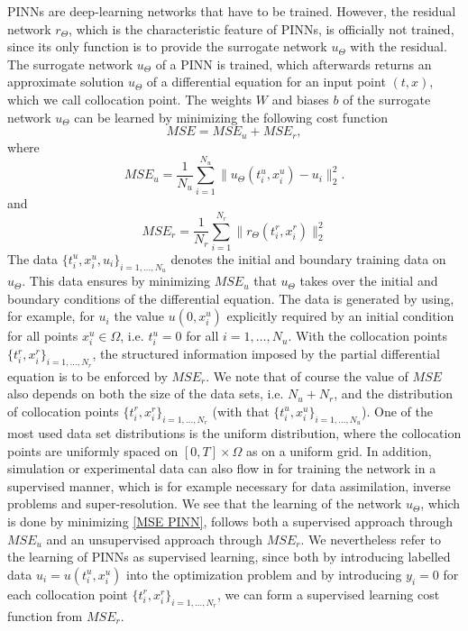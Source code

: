 PINNs are deep-learning networks that have to be trained. However, the residual network $r_\Theta$, which is the characteristic feature of PINNs, is officially not trained, since its only function is to provide the surrogate network $u_\Theta$ with the residual. The surrogate network $u_\Theta$ of a PINN is trained, which afterwards returns an approximate solution $u_\Theta$ of a differential equation for an input point $(t,x)$, which we call collocation point. The weights $W$ and biases $b$ of the surrogate network $u_\Theta$ can be learned by minimizing the following cost function
\begin{equation}
    \label{MSE PINN}
    MSE = MSE_u + MSE_r, 
\end{equation}
where
\begin{equation*}
    MSE_u = \frac{1}{N_u} \sum^{N_u}_{i = 1} \lVert u_\Theta(t^{u}_i, x^{u}_i) - u_i \rVert^{2}_{2}.
\end{equation*}
and
\begin{equation*}
    MSE_r = \frac{1}{N_r} \sum^{N_r}_{i = 1} \lVert r_\Theta (t^{r}_i, x^{r}_i) \rVert^{2}_{2}
\end{equation*}
The data $\{t^{u}_i, x^{u}_i, u_i \}_{i = 1, \ldots, N_u}$ denotes the initial and boundary training data on $u_\Theta$. This data ensures by minimizing $MSE_u$ that $u_\Theta$ takes over the initial and boundary conditions of the differential equation. The data is generated by using, for example, for $u_i$ the value $u(0,x^{u}_i)$ explicitly required by an initial condition for all points $x^{u}_i \in \Omega$, i.e. $t^{u}_i = 0$ for all $i = 1, \ldots, N_u$. With the collocation points $\{t^{r}_i, x^{r}_i \}_{i = 1, \ldots, N_r}$, the structured information imposed by the partial differential equation is to be enforced by $MSE_r$. We note that of course the value of $MSE$ also depends on both the size of the data sets, i.e. $N_u + N_r$, and the distribution of collocation points $\{t^{r}_i, x^{r}_i \}_{i = 1, \ldots, N_r}$ (with that $\{t^{u}_i, x^{u}_i \}_{i = 1, \ldots, N_u}$). One of the most used data set distributions is the uniform distribution, where the collocation points are uniformly spaced on $\left[ 0, T \right] \times \Omega$ as on a uniform grid. In addition, simulation or experimental data can also flow in for training the network in a supervised manner, which is for example necessary for data assimilation, inverse problems and super-resolution. We see that the learning of the network $u_\Theta$, which is done by minimizing \cref{MSE PINN}, follows both a supervised approach through $MSE_u$ and an unsupervised approach through $MSE_r$. We nevertheless refer to the learning of PINNs as supervised learning, since both by introducing labelled data  $u_i = u(t^{u}_i, x^{u}_i)$ into the optimization problem and by introducing $y_i=0$ for each collocation point $\{t^{r}_i, x^{r}_i \}_{i = 1, \ldots, N_r}$, we can form a supervised learning cost function from $MSE_r$. \\
